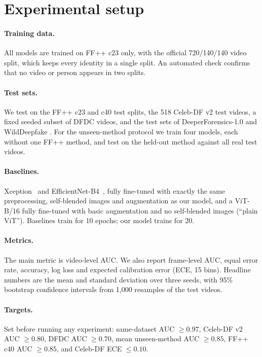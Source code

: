 \section{Experimental setup}

\paragraph{Training data.} All models are trained on FF++ c23 only, with the official
720/140/140 video split, which keeps every identity in a single split. An automated check
confirms that no video or person appears in two splits.

\paragraph{Test sets.} We test on the FF++ c23 and c40 test splits, the 518 Celeb-DF v2 test
videos, a fixed seeded subset of  DFDC videos, and the test sets of
DeeperForensics-1.0 and WildDeepfake . For the unseen-method
protocol we train four models, each without one FF++ method, and test on the held-out method
against all real test videos.

\paragraph{Baselines.} Xception~\citep{chollet2017xception} and
EfficientNet-B4~\citep{tan2019efficientnet}, fully fine-tuned with exactly the same
preprocessing, self-blended images and augmentation as our model, and a ViT-B/16 fully
fine-tuned with basic augmentation and no self-blended images (``plain ViT''). Baselines
train for 10 epochs; our model trains for 20.

\paragraph{Metrics.} The main metric is video-level AUC. We also report frame-level AUC, equal
error rate, accuracy, log loss and expected calibration error (ECE, 15 bins). Headline numbers
are the mean and standard deviation over three seeds, with 95\% bootstrap confidence intervals
from 1{,}000 resamples of the test videos.

\paragraph{Targets.} Set before running any experiment: same-dataset AUC $\geq 0.97$,
Celeb-DF v2 AUC $\geq 0.80$, DFDC AUC $\geq 0.70$, mean unseen-method AUC $\geq 0.85$, FF++ c40
AUC $\geq 0.85$, and Celeb-DF ECE $\leq 0.10$.
